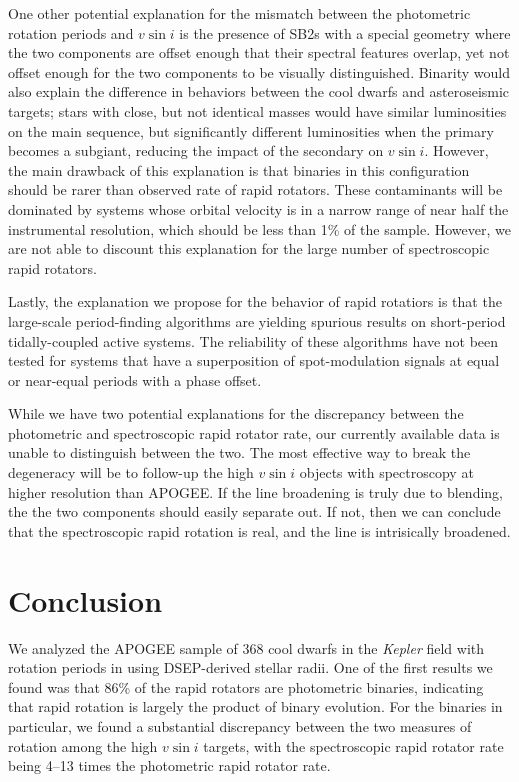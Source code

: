 \documentclass[manuscript]{aastex6}
\newcommand{\vsini}{\ensuremath{v \sin i}}
\newcommand{\Kepler}{\mbox{\textit{Kepler}}}
\newcommand{\gvs}{\authorcomment1}
\begin{document}
One other potential explanation for the mismatch between the photometric
rotation periods and \vsini{} is the presence of SB2s with a special geometry
where the two components are offset enough that their spectral features
overlap, yet not offset enough for the two components to be visually
distinguished. Binarity would also explain the difference in behaviors
between the cool dwarfs and asteroseismic targets; stars with close, but
not identical masses would have similar luminosities on the main
sequence, but significantly different luminosities when the primary
becomes a subgiant, reducing the impact of the secondary on
\vsini{}. However, the main drawback of this explanation is that
binaries in this configuration should be rarer than observed rate of
rapid rotators. These contaminants will be dominated by systems whose
orbital velocity is in a narrow range of near half the instrumental
resolution, which should be less than 1\% of the sample. However, we are
not able to discount this explanation for the large number of
spectroscopic rapid rotators.

Lastly, the explanation we propose for the behavior of rapid rotatiors is that 
the large-scale period-finding algorithms are yielding
spurious results on short-period tidally-coupled active systems. The
reliability of these algorithms have not been tested for systems that
have a superposition of spot-modulation signals at equal or near-equal
periods with a phase offset. 

While we have two potential explanations for the discrepancy between the
photometric and spectroscopic rapid rotator rate, our currently
available data is unable to distinguish between the two. The most
effective way to break the degeneracy will be to follow-up the high
\vsini{} objects with spectroscopy at higher resolution than APOGEE\@. If
the line broadening is truly due to blending, the the two components
should easily separate out. If not, then we can conclude that the
spectroscopic rapid rotation is real, and the line is intrisically
broadened.

\section{Conclusion}
\label{sec:conclusions}

\gvs{Under Construction}

We analyzed the APOGEE sample of 368 cool dwarfs in the \Kepler{} field with 
rotation periods in \citet{McQuillan14} using DSEP-derived stellar radii. One
of the first results we found was that 86\% of the rapid rotators are
photometric binaries, indicating that rapid rotation is largely the product of
binary evolution. For the binaries in particular, we
found a substantial discrepancy between the two measures of rotation
among the high \vsini{} targets, with the spectroscopic rapid
rotator rate being 4--13 times the photometric rapid rotator rate. 
\end{document}
